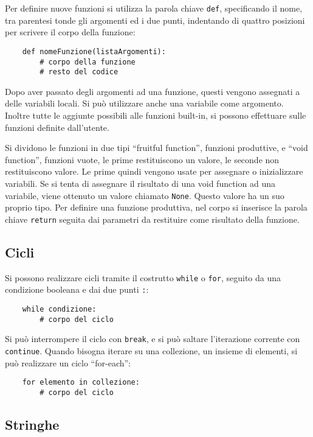 \documentclass{article}
\numberwithin{equation}{subsection}
\begin{document}
Per definire nuove funzioni si utilizza la parola chiave \verb|def|, specificando il nome, tra parentesi tonde gli argomenti ed i due punti, indentando di quattro posizioni 
per scrivere il corpo della funzione:
\begin{verbatim}
    def nomeFunzione(listaArgomenti):
        # corpo della funzione
        # resto del codice
\end{verbatim}

Dopo aver passato degli argomenti ad una funzione, questi vengono assegnati a delle variabili locali. Si può utilizzare anche una variabile come argomento. Inoltre 
tutte le aggiunte possibili alle funzioni built-in, si possono effettuare sulle funzioni definite dall'utente. 

Si dividono le funzioni in due tipi ``fruitful function'', funzioni produttive, e ``void function'', funzioni vuote,  le prime restituiscono un valore, le seconde non restituiscono valore. Le prime quindi 
vengono usate per assegnare o inizializzare variabili. Se si tenta di assegnare il risultato di una void function ad una variabile, viene ottenuto un valore chiamato \verb|None|. 
Questo valore ha un suo proprio tipo. Per definire una funzione produttiva, nel corpo si inserisce la parola chiave \verb|return| seguita dai parametri da restituire come 
risultato della funzione. 

\subsection{Cicli}

Si possono realizzare cicli tramite il costrutto \verb|while| o \verb|for|, seguito da una condizione booleana e dai due punti \verb|:|:
\begin{verbatim}
    while condizione: 
        # corpo del ciclo
\end{verbatim}

Si può interrompere il ciclo con \verb|break|, e si può saltare l'iterazione corrente con \verb|continue|. Quando bisogna iterare su una collezione, un insieme di elementi, 
si può realizzare un ciclo ``for-each'': 
\begin{verbatim}
    for elemento in collezione: 
        # corpo del ciclo
\end{verbatim}

\subsection{Stringhe}
\end{document}
